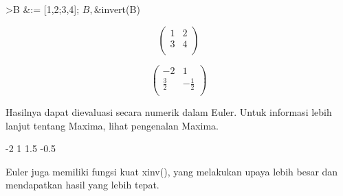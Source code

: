 \begin{eulernotebook}
\begin{eulercomment}
\begin{eulercomment}
\begin{eulerttcomment}
\end{eulerttcomment}
\begin{eulerprompt}
>B &:= [1,2;3,4]; $B, $&invert(B)
\end{eulerprompt}
\begin{eulerformula}
\[
\begin{pmatrix}1 & 2 \\ 3 & 4 \\ \end{pmatrix}
\]
\end{eulerformula}
\begin{eulerformula}
\[
\begin{pmatrix}-2 & 1 \\ \frac{3}{2} & -\frac{1}{2} \\ 
 \end{pmatrix}
\]
\end{eulerformula}
\begin{eulercomment}
Hasilnya dapat dievaluasi secara numerik dalam Euler. Untuk informasi
lebih lanjut tentang Maxima, lihat pengenalan Maxima.
\end{eulercomment}
\begin{euleroutput}
             -2             1 
            1.5          -0.5 
\end{euleroutput}
\begin{eulercomment}
Euler juga memiliki fungsi kuat xinv(), yang melakukan upaya lebih
besar dan mendapatkan hasil yang lebih tepat.


\end{eulercomment}
\end{eulercomment}
\end{eulercomment}
\end{eulernotebook}
